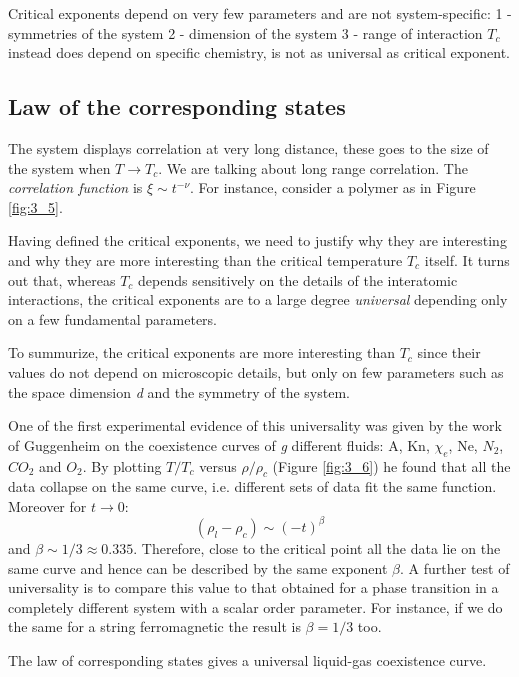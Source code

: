 \documentclass[../main/main.tex]{subfiles}
\begin{document}
Critical exponents depend on very few parameters and are not system-specific:
1 - symmetries of the system
2 - dimension of the system
3 - range of interaction
$T_c$ instead does depend on specific chemistry, is not as universal as critical exponent.


\subsection{Law of the corresponding states}
The system displays correlation at very long distance, these goes to the size of the system when \( T \rightarrow T_c \). We are talking about long range correlation. The \emph{correlation function} is \( \xi \sim t^{-\nu } \).
For instance, consider a polymer as in Figure \ref{fig:3_5}.

Having defined the critical exponents, we need to justify why they are interesting and  why they are more interesting than the critical temperature \( T_c \) itself. It turns out that, whereas \( T_c \) depends sensitively on the details of the interatomic interactions, the critical exponents are to a large degree \emph{universal} depending only on a few fundamental parameters.

To summurize, the critical exponents are more interesting than \( T_c \) since their values do not depend on microscopic details, but only on few parameters such as the space dimension \emph{d} and the symmetry of the system.

One of the first experimental evidence of this universality was given by the work of Guggenheim on the coexistence curves of \emph{g} different fluids: A, Kn, $\chi_e$, Ne, $N_2$, $CO_2$ and $O_2$. By plotting \( T/T_c \) versus \( \rho /\rho _c \) (Figure \ref{fig:3_6}) he found that all the data collapse on the same curve, i.e. different sets of data fit the  same function. Moreover for \( t \rightarrow 0 \):
\begin{equation*}
  (\rho _l - \rho _c) \sim (-t)^{\beta}
  \label{eq:}
\end{equation*}
and \( \beta \sim 1/3 \approx 0.335 \).  Therefore, close to the critical point all the data lie on the same curve and hence can be described by the same exponent \( \beta  \).
A further test of universality is to compare this value to that obtained for a phase transition in a completely different system with a scalar order parameter. For instance, if we do the same for a string ferromagnetic the result is \( \beta = 1/3 \)  too.
\begin{remark}
The law of corresponding states gives a universal liquid-gas coexistence curve.
\end{remark}
\end{document}
